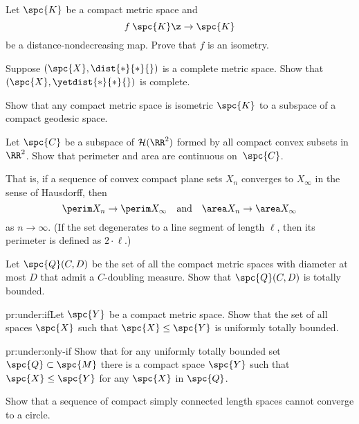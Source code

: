 \vskip 50mm

\noindent Let $\spc{K}$  be a compact metric space and
\[f\:\spc{K}\z\to \spc{K}\] 
be a distance-nondecreasing map.
Prove that $f$ is an isometry.

\vskip 50mm

\noindent 
Suppose $(\spc{X},\dist{*}{*}{})$ is a complete metric space.
Show that $(\spc{X},\yetdist{*}{*}{})$ is complete.

\newpage
\pagestyle{empty}

\noindent Show that any compact metric space is isometric $\spc{K}$ to a subspace of a compact geodesic space. 

\vskip 50mm

\noindent Let $\spc{C}$ be a subspace of $\mathcal{H}(\RR^2)$ formed by all compact convex subsets in $\RR^2$.
Show that perimeter and area are continuous on~$\spc{C}$.

That is, if a sequence of convex compact plane sets $X_n$ converges to $X_\infty$ in the sense of Hausdorff, then 
\[\perim X_n\to \perim X_\infty\quad\text{and}\quad\area X_n\to\area X_\infty\]
as $n\to\infty$.
(If the set degenerates to a line segment of length $\ell$, then its perimeter is defined as $2\cdot \ell$.)

\vskip 50mm

\noindent Let $\spc{Q}(C,D)$ be the set of all the compact metric spaces with diameter at most $D$ that admit a $C$-doubling measure.
Show that $\spc{Q}(C,D)$ is totally bounded.

\newpage
\pagestyle{empty}

\noindent
\begin{subthm}{pr:under:if}Let $\spc{Y}$ be a compact metric space.
Show that the set of all spaces $\spc{X}$ such that $\spc{X}\le\spc{Y}$
is uniformly totally bounded.
\end{subthm}

\begin{subthm}{pr:under:only-if}
Show that for any uniformly totally bounded set $\spc{Q}\subset\spc{M}$ there is a compact space $\spc{Y}$
such that $\spc{X}\le\spc{Y}$ for any $\spc{X}$ in $\spc{Q}$.
\end{subthm}


\vskip 50mm

\noindent \begin{subthm}{}
Show that a sequence of compact simply connected length spaces cannot converge to a circle.
\end{subthm}

